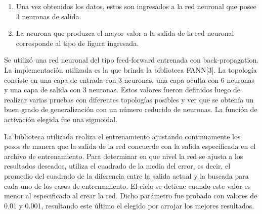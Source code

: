 \documentclass[pdftex,a4paper,12pt]{article}
\begin{document}
\begin{enumerate}
\begin{itemize}
					  $ R{m}:  $	 \textit{ Rect\'angulo de \'area m\'inima que contiene al Blob. }

                      \item N\'umero de v\'ertices del pol\'igono simplificado que
                      define al blob. Cuando se detecta un blob, se le pide a la
                      biblioteca utilizada un pol\'igono que define a ese blob
                      (una lista de puntos x,y). El problema que surge es que
                      esa lista contiene muchos puntos que est\'an de m\'as o son
                      redundantes, por lo que se aplica un algoritmo[4] para la
                      reducci\'on de los mismos que elimina los puntos que no son
                      necesarios sin deformar al pol\'igono.
                      
  					  \begin{equation} s_{3} = \frac { \#Vertices }
				                      { K  }		\end{equation}

					  $ K:  $	 \textit{M\'axima cantidad de v\'ertices del pol\'igono simplificado. }
                      
 					\end{itemize} 
				\item   Una vez obtenidos los datos, estos son ingresados a la red neuronal
				que posee 3 neuronas de salida.
				\item La neurona que produzca el mayor valor a la salida de la red neuronal corresponde
				al tipo de figura ingresada.

            \end{enumerate}      

Se utiliz\'o una red neuronal del tipo feed-forward entrenada con back-propagation. La implementaci\'on 
utilizada es la que brinda la biblioteca FANN[3]. La topolog\'ia consiste en una capa de entrada con 3
neuronas, una capa oculta con 6 neuronas y una capa de salida con 3 neuronas. Estos valores fueron 
definidos luego de realizar varias pruebas con diferentes topolog\'ias posibles y ver que se obten\'ia 
un buen grado de generalizaci\'on con un n\'umero reducido de neuronas. La funci\'on de activaci\'on 
elegida fue una sigmoidal.

La biblioteca utilizada realiza el entrenamiento ajustando continuamente los pesos de manera que 
la salida de la red  concuerde con la salida especificada en el archivo de entrenamiento. Para 
determinar en que nivel la red se ajusta a los resultados deseados, utiliza el cuadrado de la media 
del error, es decir, el promedio del cuadrado de la diferencia entre la salida actual y la buscada para
cada uno de los casos de entrenamiento. El ciclo se detiene cuando este valor es menor al especificado
al crear la red. Dicho par\'ametro fue probado con valores de 0.01 y 0.001, resultando este \'ultimo el 
elegido por arrojar los mejores resultados.
\end{document}
